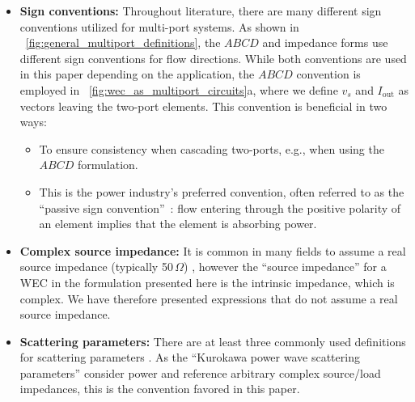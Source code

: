 \documentclass[5p,times]{elsarticle}
\begin{document}
\begin{itemize}
        \item \textbf{Sign conventions:} Throughout literature, there are many different sign conventions utilized for multi-port systems.
        As shown in \figurename~\ref{fig:general_multiport_definitions}, the $ABCD$ and impedance forms use different sign conventions for flow directions.
        While both conventions are used in this paper depending on the application, the $ABCD$ convention is employed in \figurename~\ref{fig:wec_as_multiport_circuits}a, where we define $v_s$ and $I_{\textrm{out}}$ as vectors leaving the two-port elements.
        This convention is beneficial in two ways:
        \begin{itemize}
                \item To ensure consistency when cascading two-ports, e.g., when using the $ABCD$ formulation.
                \item This is the power industry's preferred convention, often referred to as the ``passive sign convention''~\cite{CircuitFundamental}: flow entering through the positive polarity of an element implies that the element is absorbing power.
        \end{itemize}
        \item \textbf{Complex source impedance:} It is common in many fields to assume a real source impedance (typically 50\,$\Omega$) \cite{Kurokawa:1965aa}, however the ``source impedance'' for a WEC in the formulation presented here is the intrinsic impedance, which is complex.
        We have therefore presented expressions that do not assume a real source impedance.
        \item \textbf{Scattering parameters:} There are at least three commonly used definitions for scattering parameters \cite{Kurokawa:1965aa,Amakawa:2016aa}.
        As the ``Kurokawa power wave scattering parameters'' consider power and reference arbitrary complex source/load impedances, this is the convention favored in this paper.
\end{itemize}



\end{document}
